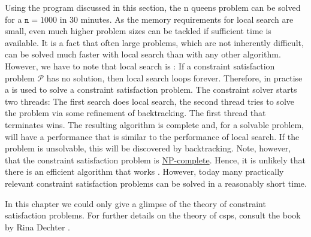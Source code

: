 Using the program discussed in this section, the n queens problem can be solved for a $\texttt{n} = 1000$ in
30 minutes.  As the memory requirements for local search are small, even much higher problem sizes can be
tackled if sufficient time is available.  It is a fact that often large problems, which are not inherently
difficult, can be solved much faster with local search than with any other algorithm.  
However, we have to note that local search is :  If a
constraint satisfaction problem $\mathcal{P}$ has no solution, then local search loops forever.  Therefore, in
practise a  is used to solve a constraint satisfaction problem.  The constraint solver
starts two threads: The first search does local search, the second thread tries to solve the problem via some
refinement of backtracking.  The first thread that terminates wins.  The resulting algorithm is complete and,
for a solvable problem, will have a performance that is similar to the performance of local search.  If the
problem is unsolvable, this will   be discovered by backtracking.  Note, however, that the
constraint satisfaction problem is \href{https://en.wikipedia.org/wiki/NP-completeness}{NP-complete}.  Hence,
it is unlikely that there is an efficient algorithm that works .  However, today many practically
relevant constraint satisfaction problems can be solved in a reasonably short time. 

In this chapter we could only give a glimpse of the theory of constraint satisfaction problems.
For further details on the theory of \ac{csp}s, consult the book  by Rina Dechter
\cite{dechter:2003}.

